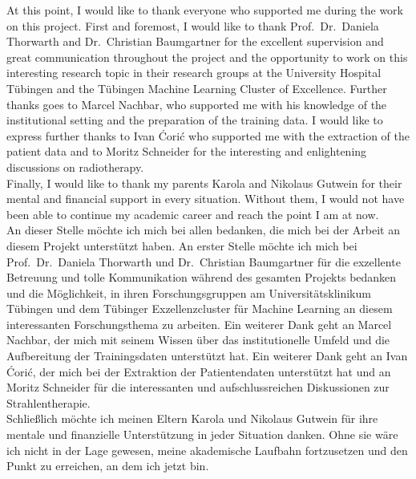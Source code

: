 At this point, I would like to thank everyone who supported me during the work on this project.
First and foremost, I would like to thank Prof.~Dr.~Daniela Thorwarth and Dr.~Christian Baumgartner for the excellent supervision and great communication throughout the project and the opportunity to work on this interesting research topic in their research groups at the University Hospital Tübingen and the Tübingen Machine Learning Cluster of Excellence.
Further thanks goes to Marcel Nachbar, who supported me with his knowledge of the institutional setting and the preparation of the training data. 
I would like to express further thanks to Ivan Ćorić who supported me with the extraction of the patient data and to Moritz Schneider for the interesting and enlightening discussions on radiotherapy.\\
Finally, I would like to thank my parents Karola and Nikolaus Gutwein for their mental and financial support in every situation. Without them, I would not have been able to continue my academic career and reach the point I am at now. \\

An dieser Stelle möchte ich mich bei allen bedanken, die mich bei der Arbeit an diesem Projekt unterstützt haben.
An erster Stelle möchte ich mich bei Prof.~Dr.~Daniela Thorwarth und Dr.~Christian Baumgartner für die exzellente Betreuung und tolle Kommunikation während des gesamten Projekts bedanken und die Möglichkeit, in ihren Forschungsgruppen am Universitätsklinikum Tübingen und dem Tübinger Exzellenzcluster für Machine Learning an diesem interessanten Forschungsthema zu arbeiten.
Ein weiterer Dank geht an Marcel Nachbar, der mich mit seinem Wissen über das institutionelle Umfeld und die Aufbereitung der Trainingsdaten unterstützt hat. 
Ein weiterer Dank geht an Ivan Ćorić, der mich bei der Extraktion der Patientendaten unterstützt hat und an Moritz Schneider für die interessanten und aufschlussreichen Diskussionen zur Strahlentherapie.\\
Schließlich möchte ich meinen Eltern Karola und Nikolaus Gutwein für ihre mentale und finanzielle Unterstützung in jeder Situation danken. Ohne sie wäre ich nicht in der Lage gewesen, meine akademische Laufbahn fortzusetzen und den Punkt zu erreichen, an dem ich jetzt bin. 